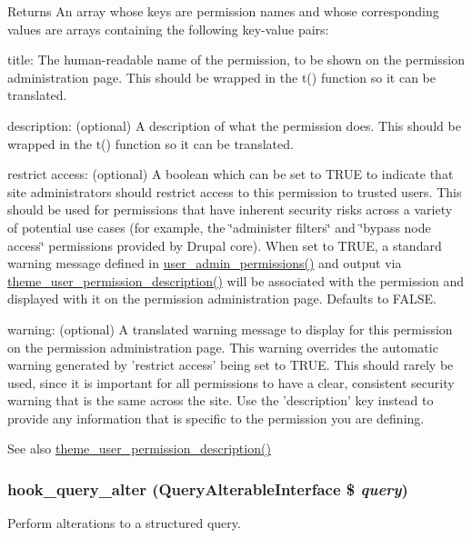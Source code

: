 \begin{DoxyReturn}{Returns}
An array whose keys are permission names and whose corresponding values are arrays containing the following key-\/value pairs:
\begin{DoxyItemize}
\item title: The human-\/readable name of the permission, to be shown on the permission administration page. This should be wrapped in the t() function so it can be translated.
\item description: (optional) A description of what the permission does. This should be wrapped in the t() function so it can be translated.
\item restrict access: (optional) A boolean which can be set to TRUE to indicate that site administrators should restrict access to this permission to trusted users. This should be used for permissions that have inherent security risks across a variety of potential use cases (for example, the \char`\"{}administer filters\char`\"{} and \char`\"{}bypass node access\char`\"{} permissions provided by Drupal core). When set to TRUE, a standard warning message defined in \hyperlink{group__forms_gabcf8ce0bd54bdce14e7abeea7ed2bad9}{user\_\-admin\_\-permissions()} and output via \hyperlink{group__themeable_ga459815f84e50a6416f625577c99b9017}{theme\_\-user\_\-permission\_\-description()} will be associated with the permission and displayed with it on the permission administration page. Defaults to FALSE.
\item warning: (optional) A translated warning message to display for this permission on the permission administration page. This warning overrides the automatic warning generated by 'restrict access' being set to TRUE. This should rarely be used, since it is important for all permissions to have a clear, consistent security warning that is the same across the site. Use the 'description' key instead to provide any information that is specific to the permission you are defining.
\end{DoxyItemize}
\end{DoxyReturn}
\begin{DoxySeeAlso}{See also}
\hyperlink{group__themeable_ga459815f84e50a6416f625577c99b9017}{theme\_\-user\_\-permission\_\-description()} 
\end{DoxySeeAlso}
\hypertarget{group__hooks_gaf166f6375e9f7b5919d719eb91198d47}{
\subsubsection[{hook\_\-query\_\-alter}]{\setlength{\rightskip}{0pt plus 5cm}hook\_\-query\_\-alter ({\bf QueryAlterableInterface} \$ {\em query})}}
\label{group__hooks_gaf166f6375e9f7b5919d719eb91198d47}
Perform alterations to a structured query.

